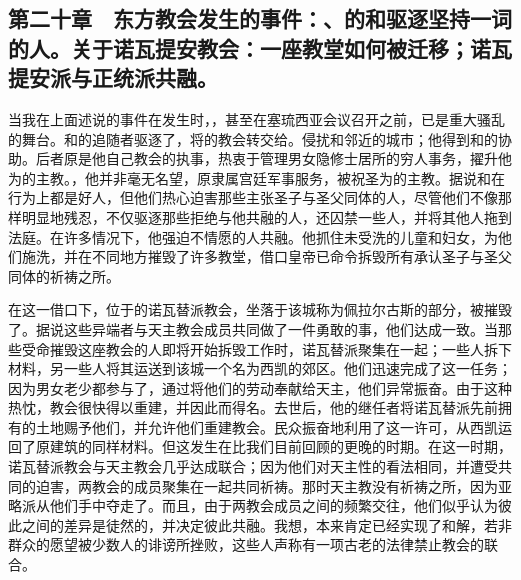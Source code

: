 
\subsection{第二十章　东方教会发生的事件：、的和驱逐坚持一词的人。关于诺瓦提安教会：一座教堂如何被迁移；诺瓦提安派与正统派共融。}

当我在上面述说的事件在发生时，，甚至在塞琉西亚会议召开之前，已是重大骚乱的舞台。和的追随者驱逐了，将的教会转交给。侵扰和邻近的城市；他得到和的协助。后者原是他自己教会的执事，热衷于管理男女隐修士居所的穷人事务，擢升他为的主教。，他并非毫无名望，原隶属宫廷军事服务，被祝圣为的主教。据说和在行为上都是好人，但他们热心迫害那些主张圣子与圣父同体的人，尽管他们不像那样明显地残忍，不仅驱逐那些拒绝与他共融的人，还囚禁一些人，并将其他人拖到法庭。在许多情况下，他强迫不情愿的人共融。他抓住未受洗的儿童和妇女，为他们施洗，并在不同地方摧毁了许多教堂，借口皇帝已命令拆毁所有承认圣子与圣父同体的祈祷之所。\par

在这一借口下，位于的诺瓦替派教会，坐落于该城称为佩拉尔古斯的部分，被摧毁了。据说这些异端者与天主教会成员共同做了一件勇敢的事，他们达成一致。当那些受命摧毁这座教会的人即将开始拆毁工作时，诺瓦替派聚集在一起；一些人拆下材料，另一些人将其运送到该城一个名为西凯的郊区。他们迅速完成了这一任务；因为男女老少都参与了，通过将他们的劳动奉献给天主，他们异常振奋。由于这种热忱，教会很快得以重建，并因此而得名。去世后，他的继任者将诺瓦替派先前拥有的土地赐予他们，并允许他们重建教会。民众振奋地利用了这一许可，从西凯运回了原建筑的同样材料。但这发生在比我们目前回顾的更晚的时期。在这一时期，诺瓦替派教会与天主教会几乎达成联合；因为他们对天主性的看法相同，并遭受共同的迫害，两教会的成员聚集在一起共同祈祷。那时天主教没有祈祷之所，因为亚略派从他们手中夺走了。而且，由于两教会成员之间的频繁交往，他们似乎认为彼此之间的差异是徒然的，并决定彼此共融。我想，本来肯定已经实现了和解，若非群众的愿望被少数人的诽谤所挫败，这些人声称有一项古老的法律禁止教会的联合。\par


